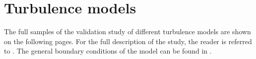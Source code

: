 \section{Turbulence models}
\label{sec:appendix_turbulence_study}


The full samples of the validation study of different turbulence models are shown on the following pages.
For the full description of the study, the reader is referred to . The general boundary conditions of the model can be found in .





\cleartoleftpage
\enlargethispage{3cm}


\clearpage



\clearpage

